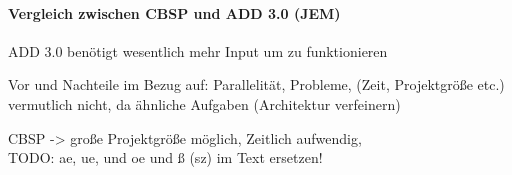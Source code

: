 \paragraph{Vergleich zwischen CBSP und ADD 3.0 (JEM)}


ADD 3.0 benötigt wesentlich mehr Input um zu funktionieren

Vor und Nachteile im Bezug auf: Parallelität, Probleme, (Zeit, Projektgröße etc.)\\

vermutlich nicht, da ähnliche Aufgaben (Architektur verfeinern) 

CBSP -> große Projektgröße möglich, Zeitlich aufwendig, \\

TODO: ae, ue, und oe und ß (sz) im Text ersetzen! \\

